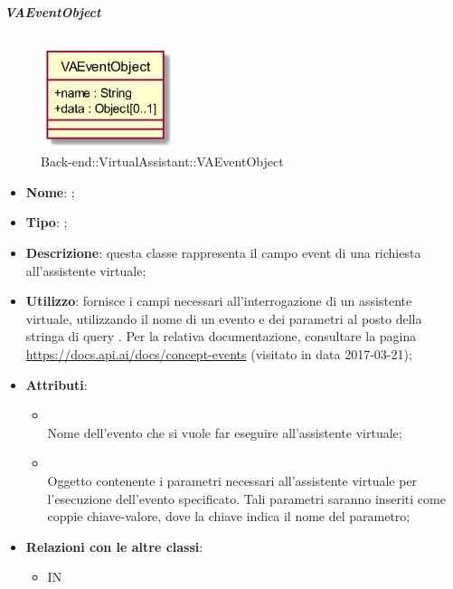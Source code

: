 \hypertarget{VAEventObject_label}{\subparagraph{VAEventObject}}
\begin{figure}[h]
	\centering
	\includegraphics[width=0.35\textwidth,height=\textheight,keepaspectratio]{images/ClassVAEventObject.png}
	\caption{Back-end::VirtualAssistant::VAEventObject}
\end{figure}
\begin{itemize}
	\item \textbf{Nome}: ;
	\item \textbf{Tipo}: ;
	\item \textbf{Descrizione}: questa classe rappresenta il campo event di una richiesta all'assistente virtuale;
	\item \textbf{Utilizzo}: fornisce i campi necessari all'interrogazione di un assistente virtuale, utilizzando il nome di un evento e dei parametri al posto della stringa di query .
Per la relativa documentazione, consultare la pagina \url{https://docs.api.ai/docs/concept-events}  (visitato in data 2017-03-21);
	\item \textbf{Attributi}:
	\begin{itemize}
		\item[]  \\
		Nome dell'evento che si vuole far eseguire all'assistente virtuale;
		\item[]  \\
		Oggetto contenente i parametri necessari all'assistente virtuale per l'esecuzione dell'evento specificato. Tali parametri saranno inseriti come coppie chiave-valore, dove la chiave indica il nome del parametro;
	\end{itemize}
	\item \textbf{Relazioni con le altre classi}:
	\begin{itemize}
		\item IN \hyperlink{VAQuery_label}{}
	\end{itemize}
\end{itemize}
\FloatBarrier

